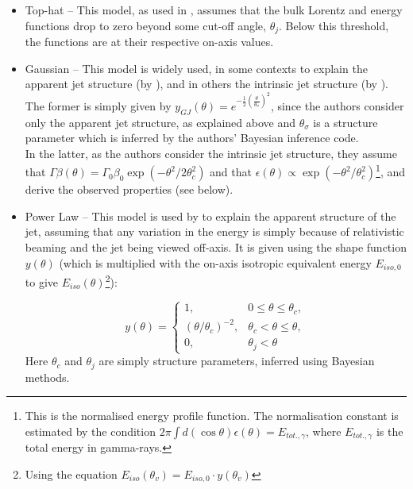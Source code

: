     \begin{itemize}

        \item Top-hat -- This model, as used in \cite{saleem_2020B}, assumes
            that the bulk Lorentz and energy functions drop to zero beyond some cut-off
            angle, $\theta_j$. Below this threshold, the functions are at their
            respective on-axis values.

       \item Gaussian -- This model is widely used, in some contexts to explain the
           apparent jet structure (by \cite{hayes_2020}), and in others the
           intrinsic jet structure (by \cite{saleem_2020B}). The former is
           simply given by $y_{GJ}(\theta) = e^{- \frac{1}{2} \left(
           \frac{\theta}{\theta_{\sigma}} \right)^2}$, since the authors consider only
           the apparent jet structure, as explained above and $\theta_\sigma$ is a
           structure parameter which is inferred by the authors' Bayesian inference
           code.\\
           In the latter, as the authors consider the intrinsic jet structure, they
           assume that $\Gamma \beta (\theta) = \Gamma_0 \beta_0 \exp\left(- \theta^2 /
           2\theta_c^2\right)$ and that $\epsilon (\theta) \propto \exp(- \theta^2 /
           \theta_c^2)$\footnote{
               This is the normalised energy profile function.  The normalisation
               constant is estimated by the condition $2\pi \int d(\cos \theta)
               \epsilon(\theta) = E_{tot., \gamma}$, where $E_{tot., \gamma}$ is the
               total energy in gamma-rays.
           }, and derive the observed properties (see below).

        \item Power Law -- This model is used by \cite{hayes_2020} to explain
            the apparent structure of the jet, assuming that any variation in the energy
            is simply because of relativistic beaming and the jet being viewed off-axis.
            It is given using the shape function $y(\theta)$ (which is multiplied with
            the on-axis isotropic equivalent energy $E_{iso, 0}$ to give
            $E_{iso}(\theta)$\footnote{Using the equation $E_{iso}(\theta_v) = E_{iso,
            0} \cdot y(\theta_v)$}):

                \begin{equation}
                    \label{eq:5}
                    y(\theta) = \begin{cases}
                                    1,
                                        & 0 \leq \theta \leq \theta_c, \\
                                    (\theta/\theta_c)^{-2},
                                        & \theta_c < \theta \leq \theta, \\
                                    0,
                                        & \theta_j < \theta
                                \end{cases}
                \end{equation}
                Here $\theta_c$ and $\theta_j$ are simply structure parameters, inferred
                using Bayesian methods.


\end{itemize}
